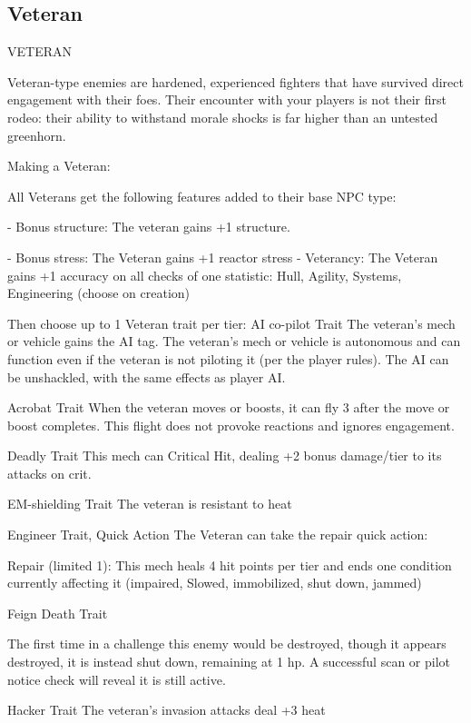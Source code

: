 \subsection{Veteran}
                                                   VETERAN

Veteran-type enemies are hardened, experienced fighters that have survived direct engagement
with their foes. Their encounter with your players is not their first rodeo: their ability to withstand
morale shocks is far higher than an untested greenhorn.


Making a Veteran:

All Veterans get the following features added to their base NPC type:

     -   Bonus structure: The veteran gains +1 structure.

     -   Bonus stress: The Veteran gains +1 reactor stress
     -   Veterancy: The Veteran gains +1 accuracy on all checks of one statistic: Hull, Agility,
         Systems, Engineering (choose on creation)

Then choose up to 1 Veteran trait per tier:
AI co-pilot
Trait
The veteran’s mech or vehicle gains the AI tag. The veteran’s mech or vehicle is autonomous and
can function even if the veteran is not piloting it (per the player rules). The AI can be unshackled,
with the same effects as player AI.


Acrobat
Trait
When the veteran moves or boosts, it can fly 3 after the move or boost completes. This flight
does not provoke reactions and ignores engagement.


Deadly
Trait
This mech can Critical Hit, dealing +2 bonus damage/tier to its attacks on crit.


EM-shielding
Trait
The veteran is resistant to heat


Engineer
Trait, Quick Action
The Veteran can take the repair quick action:

         Repair (limited 1): This mech heals 4 hit points per tier and ends one condition currently
         affecting it (impaired, Slowed, immobilized, shut down, jammed)


Feign Death
Trait




The first time in a challenge this enemy would be destroyed, though it appears destroyed, it is
instead shut down, remaining at 1 hp. A successful scan or pilot notice check will reveal it is still
active.


Hacker
Trait
The veteran’s invasion attacks deal +3 heat


